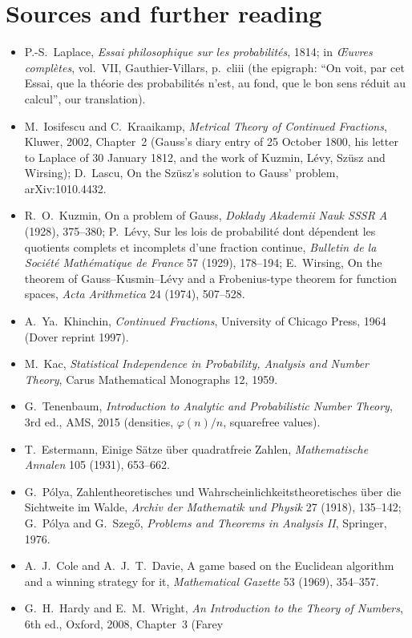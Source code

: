 \section*{Sources and further reading}

\begin{itemize}
\item P.-S.~Laplace, \emph{Essai philosophique sur les probabilités}, 1814; in \emph{Œuvres complètes}, vol.~VII, Gauthier-Villars,
p.~cliii (the epigraph: ``On voit, par cet Essai, que la théorie des probabilités n'est, au fond, que le bon sens réduit au
calcul'', our translation).
\item M.~Iosifescu and C.~Kraaikamp, \emph{Metrical Theory of Continued Fractions}, Kluwer, 2002, Chapter~2 (Gauss's diary entry of
25 October 1800, his letter to Laplace of 30 January 1812, and the work of Kuzmin, Lévy, Szüsz and Wirsing); D.~Lascu, On the Szüsz's
solution to Gauss' problem, arXiv:1010.4432.
\item R.~O.~Kuzmin, On a problem of Gauss, \emph{Doklady Akademii Nauk SSSR A} (1928), 375--380; P.~Lévy, Sur les lois de probabilité
dont dépendent les quotients complets et incomplets d'une fraction continue, \emph{Bulletin de la Société Mathématique de France} 57
(1929), 178--194; E.~Wirsing, On the theorem of Gauss--Kusmin--Lévy and a Frobenius-type theorem for function spaces, \emph{Acta
Arithmetica} 24 (1974), 507--528.
\item A.~Ya.~Khinchin, \emph{Continued Fractions}, University of Chicago Press, 1964 (Dover reprint 1997).
\item M.~Kac, \emph{Statistical Independence in Probability, Analysis and Number Theory}, Carus Mathematical Monographs 12, 1959.
\item G.~Tenenbaum, \emph{Introduction to Analytic and Probabilistic Number Theory}, 3rd ed., AMS, 2015 (densities, $\varphi(n)/n$,
squarefree values).
\item T.~Estermann, Einige Sätze über quadratfreie Zahlen, \emph{Mathematische Annalen} 105 (1931), 653--662.
\item G.~Pólya, Zahlentheoretisches und Wahrscheinlichkeitstheoretisches über die Sichtweite im Walde, \emph{Archiv der Mathematik und
Physik} 27 (1918), 135--142; G.~Pólya and G.~Szegő, \emph{Problems and Theorems in Analysis II}, Springer, 1976.
\item A.~J.~Cole and A.~J.~T.~Davie, A game based on the Euclidean algorithm and a winning strategy for it, \emph{Mathematical
Gazette} 53 (1969), 354--357.
\item G.~H.~Hardy and E.~M.~Wright, \emph{An Introduction to the Theory of Numbers}, 6th ed., Oxford, 2008, Chapter~3 (Farey

\end{itemize}
